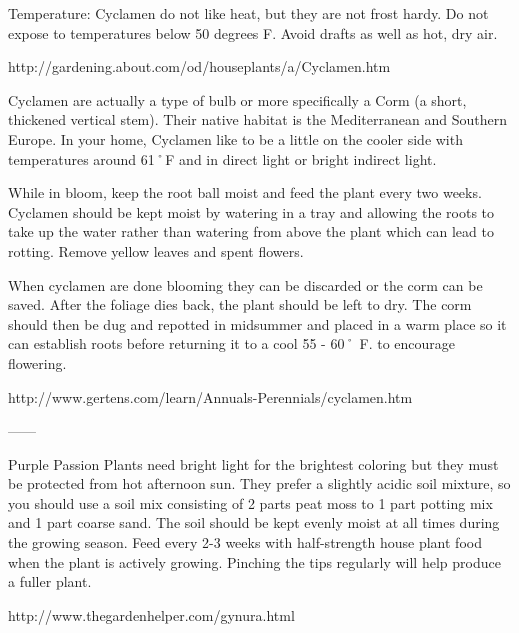 \documentclass{book}
\begin{document}
Temperature: Cyclamen do not like heat, but they are not frost hardy. Do not expose to temperatures below 50 degrees F. Avoid drafts as well as hot, dry air.



http://gardening.about.com/od/houseplants/a/Cyclamen.htm

Cyclamen are actually a type of bulb or more specifically a Corm (a short, thickened vertical stem). Their native habitat is the Mediterranean and Southern Europe. In your home, Cyclamen like to be a little on the cooler side with temperatures around 61˚F and in direct light or bright indirect light.

While in bloom, keep the root ball moist and feed the plant every two weeks. Cyclamen should be kept moist by watering in a tray and allowing the roots to take up the water rather than watering from above the plant which can lead to rotting. Remove yellow leaves and spent flowers.

When cyclamen are done blooming they can be discarded or the corm can be saved. After the foliage dies back, the plant should be left to dry. The corm should then be dug and repotted in midsummer and placed in a warm place so it can establish roots before returning it to a cool 55 - 60˚ F. to encourage flowering.



http://www.gertens.com/learn/Annuals-Perennials/cyclamen.htm

------

Purple Passion Plants need bright light for the brightest coloring but they must be protected from hot afternoon sun.
They prefer a slightly acidic soil mixture, so you should use a soil mix consisting of 2 parts peat moss to 1 part potting mix and 1 part coarse sand. The soil should be kept evenly moist at all times during the growing season.
Feed every 2-3 weeks with half-strength house plant food when the plant is actively growing.
Pinching the tips regularly will help produce a fuller plant.

http://www.thegardenhelper.com/gynura.html
\end{document}
